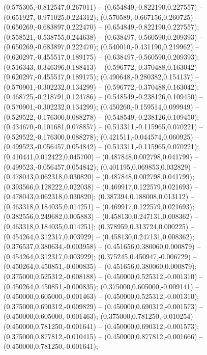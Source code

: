  (0.575305,-0.812547,0.267011) -- (0.654849,-0.822190,0.227557) -- (0.651927,-0.971025,0.224312);
 (0.570589,-0.667156,0.260725) -- (0.650269,-0.683897,0.222470) -- (0.654849,-0.822190,0.227557);
 (0.558521,-0.538755,0.244638) -- (0.638497,-0.560590,0.209393) -- (0.650269,-0.683897,0.222470);
 (0.540010,-0.431190,0.219962) -- (0.620297,-0.455517,0.189175) -- (0.638497,-0.560590,0.209393);
 (0.516343,-0.346396,0.188413) -- (0.596772,-0.370488,0.163042) -- (0.620297,-0.455517,0.189175);
 (0.490648,-0.280382,0.154137) -- (0.570901,-0.302232,0.134299) -- (0.596772,-0.370488,0.163042);
 (0.468725,-0.218791,0.124786) -- (0.548549,-0.238126,0.109450) -- (0.570901,-0.302232,0.134299);
 (0.450260,-0.159514,0.099949) -- (0.529522,-0.176300,0.088278) -- (0.548549,-0.238126,0.109450);
 (0.434670,-0.101681,0.078857) -- (0.513311,-0.115965,0.070221) -- (0.529522,-0.176300,0.088278);
 (0.421511,-0.044574,0.060925) -- (0.499523,-0.056457,0.054842) -- (0.513311,-0.115965,0.070221);
 (0.410441,0.012422,0.045700) -- (0.487848,0.002798,0.041799) -- (0.499523,-0.056457,0.054842);
 (0.401195,0.069853,0.032829) -- (0.478043,0.062318,0.030820) -- (0.487848,0.002798,0.041799);
 (0.393566,0.128222,0.022038) -- (0.469917,0.122579,0.021693) -- (0.478043,0.062318,0.030820);
 (0.387394,0.188008,0.013112) -- (0.463318,0.184035,0.014251) -- (0.469917,0.122579,0.021693);
 (0.382556,0.249682,0.005883) -- (0.458130,0.247131,0.008362) -- (0.463318,0.184035,0.014251);
 (0.378959,0.313724,0.000225) -- (0.454264,0.312317,0.003929) -- (0.458130,0.247131,0.008362);
 (0.376537,0.380634,-0.003958) -- (0.451656,0.380060,0.000879) -- (0.454264,0.312317,0.003929);
 (0.375245,0.450947,-0.006729) -- (0.450264,0.450851,-0.000835) -- (0.451656,0.380060,0.000879);
 (0.375000,0.525312,-0.008188) -- (0.450000,0.525312,-0.001310) -- (0.450264,0.450851,-0.000835);
 (0.375000,0.605000,-0.009141) -- (0.450000,0.605000,-0.001463) -- (0.450000,0.525312,-0.001310);
 (0.375000,0.690312,-0.009829) -- (0.450000,0.690312,-0.001573) -- (0.450000,0.605000,-0.001463);
 (0.375000,0.781250,-0.010254) -- (0.450000,0.781250,-0.001641) -- (0.450000,0.690312,-0.001573);
 (0.375000,0.877812,-0.010415) -- (0.450000,0.877812,-0.001666) -- (0.450000,0.781250,-0.001641);
